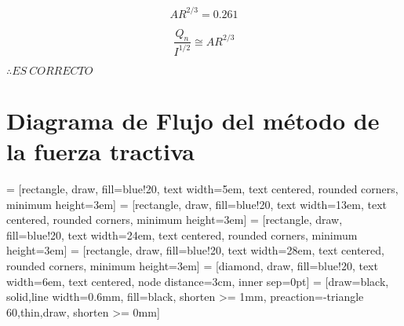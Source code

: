 \documentclass[10.5pt]{article}
\begin{document}
\begin{equation*}
  A R^{2/3} = 0.261
\end{equation*}

\begin{equation*}
  \dfrac{Q_{n}}{I^{1/2}} \cong A R^{2/3}
\end{equation*}

$\therefore ES\ CORRECTO$


\section*{Diagrama de Flujo del método de la fuerza tractiva}


 = [rectangle, draw, fill=blue!20, text width=5em, text centered, rounded corners, minimum height=3em]
 = [rectangle, draw, fill=blue!20, text width=13em, text centered, rounded corners, minimum height=3em]
 = [rectangle, draw, fill=blue!20, text width=24em, text centered, rounded corners, minimum height=3em]
 = [rectangle, draw, fill=blue!20, text width=28em, text centered, rounded corners, minimum height=3em]
 = [diamond, draw, fill=blue!20, text width=6em, text centered, node distance=3cm, inner sep=0pt]
 = [draw=black, solid,line width=0.6mm, fill=black, shorten >= 1mm, preaction={-triangle 60,thin,draw, shorten >= 0mm}] 
\end{document}
